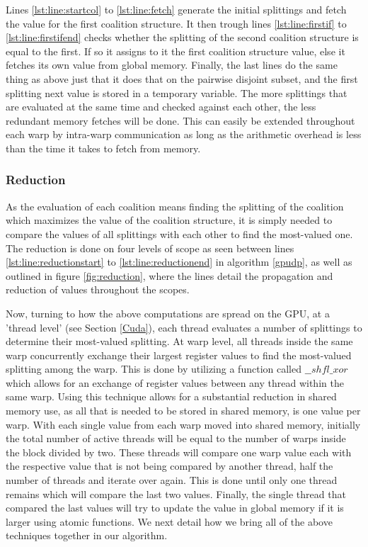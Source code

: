 \documentclass{llncs}
\begin{document}
Lines \ref{lst:line:startcol} to \ref{lst:line:fetch} generate
the initial splittings and fetch the value for the first coalition structure. It then trough lines \ref{lst:line:firstif} to \ref{lst:line:firstifend}
checks whether the splitting of the second coalition structure is equal to the first. 
If so it assigns to it the first coalition structure value, else it fetches its own value from global memory. 
Finally, the last lines do the same thing as above just that it does that on the pairwise disjoint subset, 
and the first splitting next value is stored in a temporary variable. 
The more splittings that are evaluated at the same time and checked against each other, the less redundant memory fetches will be done. This can easily be extended throughout each warp by intra-warp communication as long as the arithmetic overhead is less than the time it takes to fetch from memory. 


\subsubsection{Reduction} \label{reduction} %
As the evaluation of each coalition  means finding the splitting  of the coalition  which maximizes the value of the coalition structure, it is simply needed to compare the values of all splittings with each other to find the most-valued one.  The reduction is done on four levels of scope as seen between lines \ref{lst:line:reductionstart} to \ref{lst:line:reductionend} in algorithm \ref{gpudp},
as well as outlined in figure \ref{fig:reduction}, where the lines detail the propagation and reduction of values throughout the scopes.

Now, turning to how the above computations are spread on the GPU, at a 'thread level' (see Section \ref{Cuda}), each thread evaluates a number of splittings to determine their most-valued splitting.  At warp level, all threads inside the same warp concurrently exchange their largest register values to find the most-valued splitting among the warp. This is done by utilizing a function called $\_\_shfl\_xor$ which allows for an exchange of register values between any thread within the same warp.
Using this technique allows for a substantial reduction in shared memory use, as all that is needed to be stored in shared memory, is one value per warp.  With each single value from each warp moved into shared memory, initially the total number of active threads will be equal to the number
of warps inside the block divided by two. These threads will compare one warp value each with the respective value that is not being compared by another thread, half the number of threads and iterate over again. This is done until only one thread remains which will compare the last two values.
Finally, the single thread that compared the last values will try to update the value in global memory if it is larger using atomic functions. We next detail how we bring all of the above techniques together in our algorithm.
\end{document}
